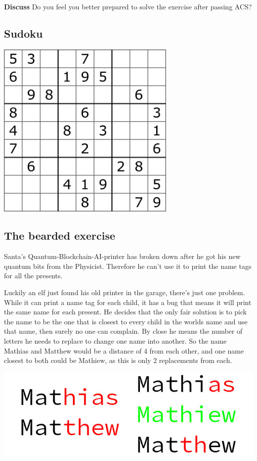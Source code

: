 \textbf{Discuss} Do you feel you better prepared to solve the exercise after
passing ACS?

\subsection{Sudoku}
\begin{center}
    \includegraphics[width=0.65\textwidth]{figures/sudoku.jpg}
\end{center}

\newpage

\subsection{The bearded exercise}

Santa's Quantum-Blockchain-AI-printer has broken down after he got his new
quantum bits from the Physicist. Therefore he can't use it to print the name
tags for all the presents.

Luckily an elf just found his old printer in the garage,
there's just one problem. While it can print a name tag for each child, it has
a bug that means it will print the same name for each present. He decides that
the only fair solution is to pick the name to be the one that is closest to
every child in the worlds name and use that name, then surely no one can
complain. By close he means the number of letters he needs to replace to change
one name into another. So the name Mathias and Matthew would be a distance of 4
from each other, and one name closest to both could be Mathiew, as this is only
2 replacements from each.

\begin{center}
\includegraphics[width=.9\textwidth]{figures/mathias.jpg}
\end{center}

